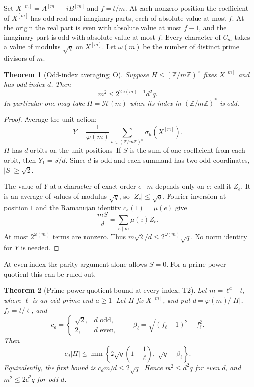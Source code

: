\documentclass[11pt]{article}
\newtheorem{theorem}{Theorem}[section]
\theoremstyle{definition}
\theoremstyle{remark}
\begin{document}
Set $X^{[m]}=A^{[m]}+iB^{[m]}$ and $f=t/m$. At each nonzero position the
coefficient of $X^{[m]}$ has odd real and imaginary parts, each of
absolute value at most $f$. At the origin the real part is even with
absolute value at most $f-1$, and the imaginary part is odd with absolute
value at most $f$. Every character of $C_m$ takes a value of modulus
$\sqrt q$ on $X^{[m]}$. Let $\omega(m)$ be the number of distinct prime
divisors of $m$.

\begin{theorem}[Odd-index averaging; O]
\label{early-o}
Suppose $H\leq(\mathbb Z/m\mathbb Z)^\times$ fixes $X^{[m]}$ and has odd
index $d$. Then
\begin{equation}
 m^2\leq 2^{2\omega(m)-1}d^2q.
 \label{early-o-bound}
\end{equation}
In particular one may take $H=\mathcal H(m)$ when its index in
$(\mathbb Z/m\mathbb Z)^*$ is odd.
\end{theorem}

\begin{proof}
Average the unit action:
\[
 Y=\frac1{\varphi(m)}\sum_{u\in(\mathbb Z/m\mathbb Z)^\times}
       \sigma_u(X^{[m]}).
\]
$H$ has $d$ orbits on the unit positions. If $S$ is the sum of one
coefficient from each orbit, then $Y_1=S/d$. Since $d$ is odd and each
summand has two odd coordinates, $|S|\geq\sqrt2$.

The value of $Y$ at a character of exact order $e\mid m$ depends only on
$e$; call it $Z_e$. It is an average of values of modulus $\sqrt q$, so
$|Z_e|\leq\sqrt q$. Fourier inversion at position $1$ and the Ramanujan
identity $c_e(1)=\mu(e)$ give
\[
 \frac{mS}{d}=\sum_{e\mid m}\mu(e)Z_e.
\]
At most $2^{\omega(m)}$ terms are nonzero. Thus
$m\sqrt2/d\leq2^{\omega(m)}\sqrt q$. No norm identity for $Y$ is needed.
\end{proof}

At even index the parity argument alone allows $S=0$. For a prime-power
quotient this can be ruled out.

\begin{theorem}[Prime-power quotient bound at every index; T2]
\label{early-t2}
Let $m=\ell^a\mid t$, where $\ell$ is an odd prime and $a\geq1$. Let $H$
fix $X^{[m]}$, and put $d=\varphi(m)/|H|$, $f_\ell=t/\ell$, and
\[
 c_d=\begin{cases}\sqrt2,&d\text{ odd},\\2,&d\text{ even},\end{cases}
 \qquad \beta_\ell=\sqrt{(f_\ell-1)^2+f_\ell^2}.
\]
Then
\begin{equation}
 c_d|H|\leq
 \min\left\{2\sqrt q\left(1-\frac1\ell\right),\;
                   \sqrt q+\beta_\ell\right\}.
 \label{early-primepower-bound}
\end{equation}
Equivalently, the first bound is $c_dm/d\leq2\sqrt q$. Hence
$m^2\leq d^2q$ for even $d$, and $m^2\leq2d^2q$ for odd $d$.
\end{theorem}
\end{document}
